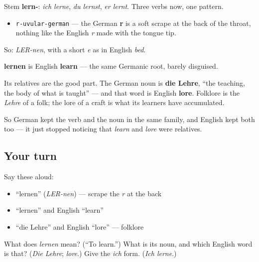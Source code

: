 Stem \textbf{lern-}: \emph{ich lerne}, \emph{du lernst}, \emph{er lernt}. Three verbs now, one pattern.

\begin{sounds}
\begin{itemize}
\raggedright
  \item \texttt{r-uvular-german} — the German \textbf{r} is a soft scrape at the back of the throat, nothing like the English \emph{r} made with the tongue tip.
\end{itemize}

So: \emph{LER-nen}, with a short \emph{e} as in English \emph{bed}.
\end{sounds}

\begin{cousinweb}
\textbf{lernen} is English \textbf{learn} — the same Germanic root, barely disguised.

Its relatives are the good part. The German noun is \textbf{die Lehre}, \textquotedblleft{}the teaching, the body of what is taught\textquotedblright{} — and that word is English \textbf{lore}. Folklore is the \emph{Lehre} of a folk; the lore of a craft is what its learners have accumulated.

So German kept the verb and the noun in the same family, and English kept both too — it just stopped noticing that \emph{learn} and \emph{lore} were relatives.
\end{cousinweb}

\subsection*{Your turn}
Say these aloud:

\begin{itemize}
\raggedright
  \item \textquotedblleft{}lernen\textquotedblright{} (\emph{LER-nen}) — scrape the \emph{r} at the back
  \item \textquotedblleft{}lernen\textquotedblright{} and English \textquotedblleft{}learn\textquotedblright{}
  \item \textquotedblleft{}die Lehre\textquotedblright{} and English \textquotedblleft{}lore\textquotedblright{} — folklore
\end{itemize}

\begin{tcolorbox}[breakable,colback=teal!4,colframe=teal!35!black,title={Before you move on}]
What does \emph{lernen} mean? (\textquotedblleft{}To learn.\textquotedblright{}) What is its noun, and which English word is that? (\emph{Die Lehre}; \emph{lore}.) Give the \emph{ich} form. (\emph{Ich lerne}.)
\end{tcolorbox}
